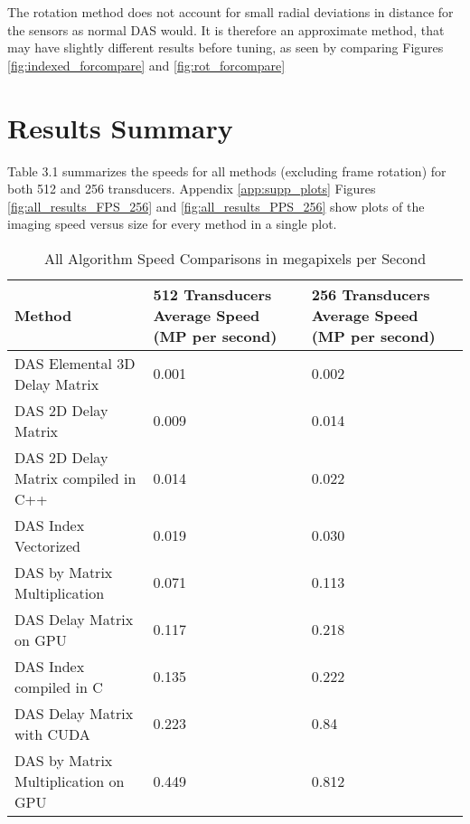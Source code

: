
    The rotation method does not account for small radial deviations in distance for the sensors as normal DAS would. It is therefore an approximate method, that may have slightly different results before tuning, as seen by comparing Figures \ref{fig:indexed_forcompare} and \ref{fig:rot_forcompare}



\section{Results Summary}
\label{chapter3:summary}

Table 3.1 summarizes the speeds for all methods (excluding frame rotation) for both 512 and 256 transducers. Appendix \ref{app:supp_plots} Figures \ref{fig:all_results_FPS_256} and \ref{fig:all_results_PPS_256} show plots of the imaging speed versus size for every method in a single plot.

\begin{table}[!ht]
    \caption{All Algorithm Speed Comparisons in megapixels per Second}
    \centering
    \begin{tabular}{|p{2in}|M{1.8in}|M{1.8in}|}
        \hline
        Method & 512 Transducers Average Speed (MP per second) & 256 Transducers Average Speed (MP per second) \\ \hline
        DAS Elemental 3D Delay Matrix & 0.001 & 0.002 \\ \hline
        DAS 2D Delay Matrix & 0.009 & 0.014 \\ \hline
        DAS 2D Delay Matrix compiled in C++ & 0.014 & 0.022 \\ \hline
        DAS Index Vectorized & 0.019 & 0.030 \\ \hline
        DAS by Matrix Multiplication & 0.071 & 0.113 \\ \hline
        DAS Delay Matrix on GPU & 0.117 & 0.218 \\ \hline
        DAS Index compiled in C & 0.135 & 0.222 \\ \hline
        DAS Delay Matrix with CUDA & 0.223 & 0.84 \\ \hline
        DAS by Matrix Multiplication on GPU & 0.449 & 0.812 \\ \hline
    \end{tabular}
\end{table}

